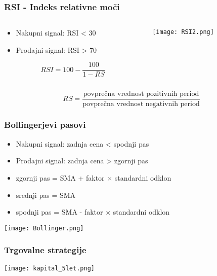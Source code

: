 \documentclass{beamer}
\begin{document}
\begin{frame}
\frametitle{RSI - Indeks relativne moči}
\begin{columns}
\begin{column}{5cm}
\begin{itemize}
\item Nakupni signal: RSI < 30
\item Prodajni signal: RSI > 70
\end{itemize}

$$RSI = 100 - \frac{100}{1-RS}$$

\end{column}

\begin{column}{6.3cm}
\texttt{[image: RSI2.png]}
\end{column}
\end{columns}
\vspace{0.5cm}
$$RS = \frac{\textrm{povprečna vrednost pozitivnih period}}{\textrm{povprečna vrednost negativnih period}}$$
\end{frame}


\begin{frame}
\frametitle{Bollingerjevi pasovi}
\begin{itemize}
\item Nakupni signal: zadnja cena < spodnji pas
\item Prodajni signal: zadnja cena > zgornji pas
\end{itemize}
\begin{itemize}
\item zgornji pas = SMA + faktor $\times$ standardni odklon
\item srednji pas = SMA
\item spodnji pas = SMA - faktor $\times$ standardni odklon
\end{itemize}
\texttt{[image: Bollinger.png]}

\end{frame}


\begin{frame}
\frametitle{Trgovalne strategije}
\texttt{[image: kapital\_5let.png]}
\end{frame}
\end{document}

